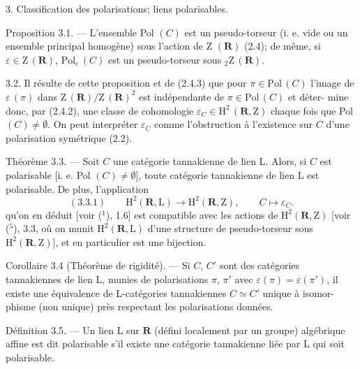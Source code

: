 \documentclass[11pt]{article}
\newcommand{\scanpage}[1]{\par\bigskip\noindent{\small\sffamily[scan #1]}\par}
\newcommand{\mspage}[1]{{\small\sffamily[p.\,#1]}}
\newcommand{\hand}[1]{\textcolor{blue}{#1}}
\begin{document}
3. Classification des polarisations; liens polarisables.

Proposition 3.1. --- L'ensemble Pol $(C)$ est un pseudo-torseur (i. e. vide
ou un ensemble principal homogène) sous l'action de Z $(\mathbf{R})$ (2.4); de même,
si $\varepsilon \in \mathrm{Z}\,(\mathbf{R})$, $\mathrm{Pol}_{\varepsilon}\,(C)$ est un pseudo-torseur sous ${}_2\mathrm{Z}\,(\mathbf{R})$.

3.2. Il résulte de cette proposition et de (2.4.3) que pour $\pi \in \mathrm{Pol}\,(C)$
l'image de $\varepsilon\,(\pi)$ dans $\mathrm{Z}\,(\mathbf{R})/\mathrm{Z}\,(\mathbf{R})^2$ est indépendante de $\pi \in \mathrm{Pol}\,(C)$ et déter-%
mine donc, par (2.4.2), une classe de cohomologie $\varepsilon_C \in \mathrm{H}^2\,(\mathbf{R}, \mathrm{Z})$ chaque fois
que Pol $(C) \neq \emptyset$. On peut interpréter $\varepsilon_C$ comme l'obstruction à l'existence
sur $C$ d'une polarisation symétrique (2.2).

\mspage{\hand{63}}

\clearpage
\scanpage{119/64}
\mspage{( 4 )}

Théorème 3.3. --- Soit $C$ une catégorie tannakienne de lien L. Alors,
si $C$ est polarisable [i. e. Pol $(C) \neq \emptyset$], toute catégorie tannakienne de lien L
est polarisable. De plus, l'application
\[ (3.3.1) \qquad \mathrm{H}^2(\mathbf{R}, \mathrm{L}) \rightarrow \mathrm{H}^2(\mathbf{R}, \mathrm{Z}), \qquad C \mapsto \varepsilon_C. \]
qu'on en déduit [voir ($^1$), 1.6] est compatible avec les actions de $\mathrm{H}^2(\mathbf{R}, \mathrm{Z})$
[voir ($^5$), 3.3, où on munit $\mathrm{H}^2(\mathbf{R}, \mathrm{L})$ d'une structure de pseudo-torseur
sous $\mathrm{H}^2(\mathbf{R}, \mathrm{Z})$], et en particulier est une bijection.

Corollaire 3.4 (Théorème de rigidité). --- Si $C$, $C'$ sont des catégories
tannakiennes de lien L, munies de polarisations $\pi$, $\pi'$ avec $\varepsilon(\pi) = \varepsilon(\pi')$,
il existe une équivalence de L-catégories tannakiennes $C \simeq C'$ unique à isomor-%
phisme (non unique) près respectant les polarisations données.

Définition 3.5. --- Un lien L sur $\mathbf{R}$ (défini localement par un groupe)
algébrique affine est dit polarisable s'il existe une catégorie tannakienne
liée par L qui soit polarisable.
\end{document}
